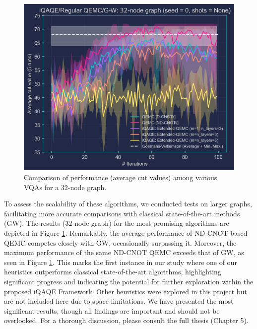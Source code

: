 \begin{figure}[H]
    \centering
    \includegraphics[width=0.95\columnwidth]{Figures/Large graphs/32-node_Graph_seed=0.png}
    \caption{Comparison of performance (average cut values) among various VQAs for a $32$-node graph.}
    \label{fig:32-node_Graph}
\end{figure}

To assess the scalability of these algorithms, we conducted tests on larger graphs, facilitating more accurate comparisons with classical state-of-the-art methods (GW). The results ($32$-node graph) for the most promising algorithms are depicted in Figure \ref{fig:32-node_Graph}. Remarkably, the average performance of ND-CNOT-based QEMC competes closely with GW, occasionally surpassing it. Moreover, the maximum performance of the same ND-CNOT QEMC exceeds that of GW, as seen in Figure \ref{fig:32-node_Graph}. This marks the first instance in our study where one of our heuristics outperforms classical state-of-the-art algorithms, highlighting significant progress and indicating the potential for further exploration within the proposed iQAQE Framework. Other heuristics were explored in this project but are not included here due to space limitations. We have presented the most significant results, though all findings are important and should not be overlooked. For a thorough discussion, please consult the full thesis (Chapter 5).

